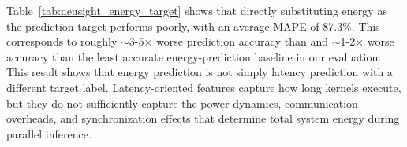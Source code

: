 Table~\ref{tab:neusight_energy_target} shows that directly substituting energy as the prediction target performs poorly, with an average MAPE of 87.3\%. 
This corresponds to roughly $\sim$3-5$\times$ worse prediction accuracy than \sys{} and $\sim$1-2$\times$ worse accuracy than the least accurate energy-prediction baseline in our evaluation. 
This result shows that energy prediction is not simply latency prediction with a different target label. 
Latency-oriented features capture how long kernels execute, but they do not sufficiently capture the power dynamics, communication overheads, and synchronization effects that determine total system energy during parallel inference.







